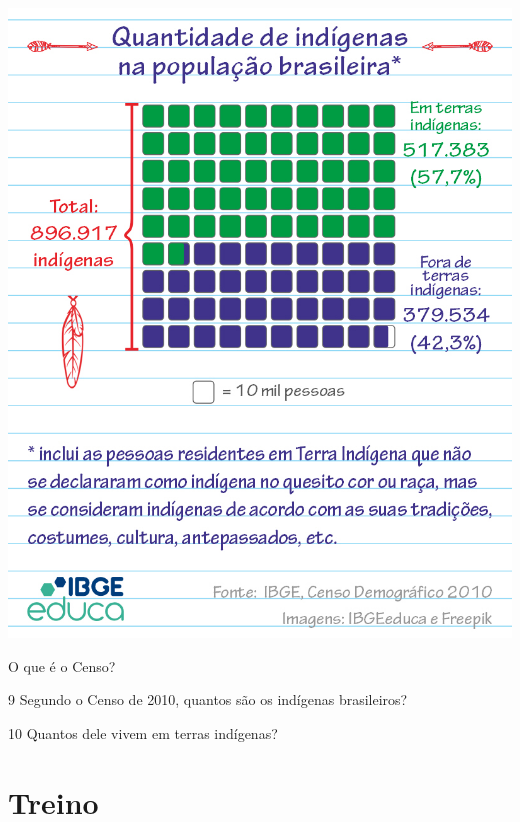 \begin{conteudo}
\begin{conteudo}
\begin{conteudo}
\begin{conteudo}
\begin{conteudo}
\begin{center}
\includegraphics[width=\textwidth]{media/image31a.jpg}
\end{center}

O que é o Censo?


\pagebreak
\num{9} Segundo o Censo de 2010, quantos são os indígenas brasileiros?


\num{10} Quantos dele vivem em terras indígenas?


\section*{Treino}


\end{conteudo}
\end{conteudo}
\end{conteudo}
\end{conteudo}
\end{conteudo}
